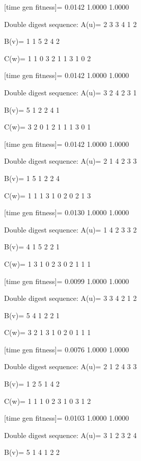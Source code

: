 [time gen fitness]=
    0.0142    1.0000    1.0000

Double digest sequence:
A(u)=
     2     3     3     4     1     2

B(v)=
     1     1     5     2     4     2

C(w)=
     1     1     0     3     2     1     1     3     1     0     2

[time gen fitness]=
    0.0142    1.0000    1.0000

Double digest sequence:
A(u)=
     3     2     4     2     3     1

B(v)=
     5     1     2     2     4     1

C(w)=
     3     2     0     1     2     1     1     1     3     0     1

[time gen fitness]=
    0.0142    1.0000    1.0000

Double digest sequence:
A(u)=
     2     1     4     2     3     3

B(v)=
     1     5     1     2     2     4

C(w)=
     1     1     1     3     1     0     2     0     2     1     3

[time gen fitness]=
    0.0130    1.0000    1.0000

Double digest sequence:
A(u)=
     1     4     2     3     3     2

B(v)=
     4     1     5     2     2     1

C(w)=
     1     3     1     0     2     3     0     2     1     1     1

[time gen fitness]=
    0.0099    1.0000    1.0000

Double digest sequence:
A(u)=
     3     3     4     2     1     2

B(v)=
     5     4     1     2     2     1

C(w)=
     3     2     1     3     1     0     2     0     1     1     1

[time gen fitness]=
    0.0076    1.0000    1.0000

Double digest sequence:
A(u)=
     2     1     2     4     3     3

B(v)=
     1     2     5     1     4     2

C(w)=
     1     1     1     0     2     3     1     0     3     1     2

[time gen fitness]=
    0.0103    1.0000    1.0000

Double digest sequence:
A(u)=
     3     1     2     3     2     4

B(v)=
     5     1     4     1     2     2

